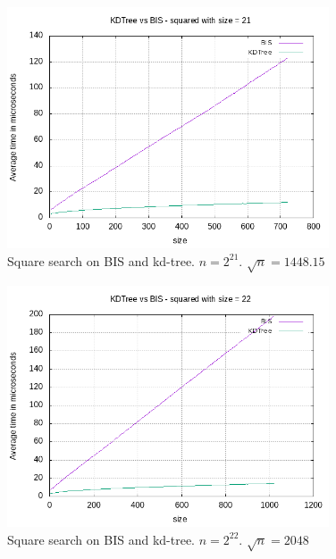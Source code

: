 \begin{figure}[h]
    \centering
    \includegraphics[width = 0.85\textwidth]{pictures/analysis/sqrt_21.png}
    \caption{Square search on BIS and kd-tree. $n=2^{21}$. $\sqrt{n} = 1448.15$}\label{fig:sqrt_21}
\end{figure}

\begin{figure}[h]
    \centering
    \includegraphics[width = 0.85\textwidth]{pictures/analysis/sqrt_22.png}
    \caption{Square search on BIS and kd-tree. $n=2^{22}$. $\sqrt{n} = 2048$}\label{fig:sqrt_22}
\end{figure}

